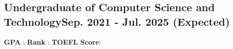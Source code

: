 \vspace*{10pt}
\subsection {{Undergraduate of Computer Science and Technology}\hfill Sep. 2021 - Jul. 2025 (Expected)}
\textbf{GPA        }: 
\textbf{Rank       }: 
\textbf{TOEFL Score}: 